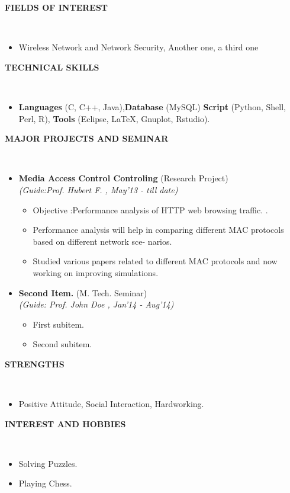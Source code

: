 \documentclass[a4paper,10pt]{article}
\newcommand{\isep}{-2 pt}
\newcommand{\lsep}{-0.5cm}
\newcommand{\resheading}[1]{{\small \colorbox{mygrey}{\begin{minipage}{0.975\textwidth}{\textbf{#1 \vphantom{p\^{E}}}}\end{minipage}}}}
\begin{document}
\resheading{\textbf{FIELDS OF INTEREST} }\\[\lsep]
\begin{itemize}
\item \noindent Wireless Network and Network Security, Another one, a third one
\end{itemize}

\resheading{\textbf{TECHNICAL SKILLS} }\\[\lsep]
\begin{itemize}
\item \noindent \textbf{Languages} (C, C++, Java),\textbf{Database} (MySQL) \textbf{Script} (Python, Shell, Perl, R), \textbf{Tools} (Eclipse, \LaTeX, Gnuplot, Rstudio).
\end{itemize}

\resheading{\textbf{MAJOR PROJECTS AND SEMINAR} }\\[\lsep]
\begin{itemize}
\item \textbf{Media Access Control Controling
} (Research Project) \\
 \emph{(Guide:Prof. Hubert F.
, May'13 - till date)} \\[-0.6cm]
	\begin{itemize}\itemsep \isep
	\item Objective :Performance analysis of HTTP web browsing traffic.
.
	\item Performance analysis will help in comparing different MAC protocols based on different network sce-
narios.

	\item Studied various papers related to different MAC protocols and now working on improving simulations.

	\end{itemize}

\item \textbf{Second Item.
} (M. Tech. Seminar) \\
 \emph{(Guide: Prof. John Doe
, Jan'14 - Aug'14)} \\[-0.6cm]
	\begin{itemize}\itemsep \isep
	\item First subitem.
	\item Second subitem.
	\end{itemize}
\end{itemize}

\resheading{\textbf{STRENGTHS} }\\[\lsep]
\begin{itemize}
\item \noindent Positive Attitude, Social Interaction, Hardworking.
\end{itemize}

\resheading{\textbf{INTEREST AND HOBBIES} }\\[\lsep]
\begin{itemize}
\item \noindent Solving Puzzles.
\item \noindent Playing Chess.

\end{itemize}
\end{document}
